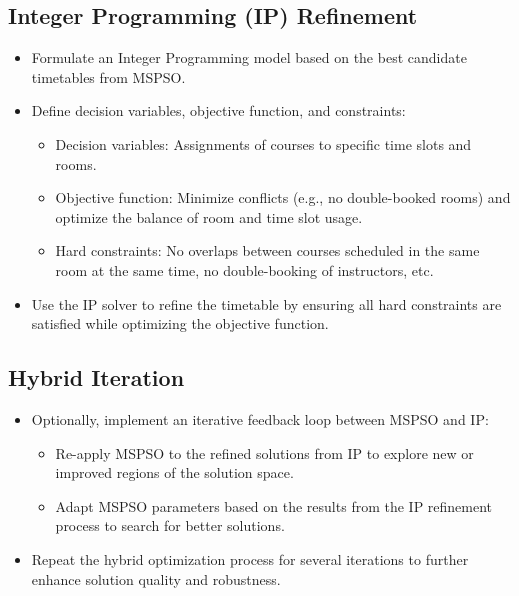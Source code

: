\documentclass{article}
\begin{document}
\subsection{Integer Programming (IP) Refinement}
\label{subsec
} \begin{itemize} \item Formulate an Integer Programming model based on the best candidate timetables from MSPSO. \item Define decision variables, objective function, and constraints: \begin{itemize} \item Decision variables: Assignments of courses to specific time slots and rooms. \item Objective function: Minimize conflicts (e.g., no double-booked rooms) and optimize the balance of room and time slot usage. \item Hard constraints: No overlaps between courses scheduled in the same room at the same time, no double-booking of instructors, etc. \end{itemize} \item Use the IP solver to refine the timetable by ensuring all hard constraints are satisfied while optimizing the objective function. \end{itemize}

\subsection{Hybrid Iteration}
\label{subsec
} \begin{itemize} \item Optionally, implement an iterative feedback loop between MSPSO and IP: \begin{itemize} \item Re-apply MSPSO to the refined solutions from IP to explore new or improved regions of the solution space. \item Adapt MSPSO parameters based on the results from the IP refinement process to search for better solutions. \end{itemize} \item Repeat the hybrid optimization process for several iterations to further enhance solution quality and robustness. \end{itemize}
\end{document}
